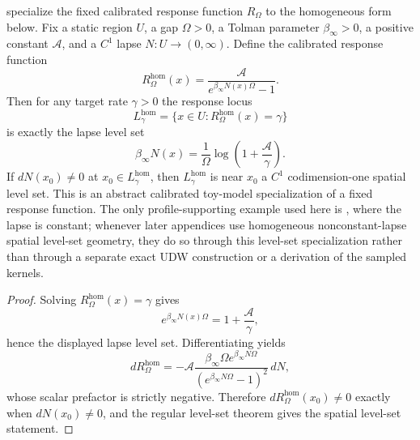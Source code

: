 \begin{lemma}\label{lem:abstract-homogeneous-specialization-main}
\ResponseStandingClause specialize the fixed calibrated response function $R_\Omega$ to the homogeneous form
below. Fix a static region $U$, a gap $\Omega>0$, a Tolman parameter
$\beta_\infty>0$, a positive constant \(\mathcal A\), and a $C^1$ lapse
$N:U\to(0,\infty)$. Define the calibrated response function
\[
R_\Omega^{\mathrm{hom}}(x)=\frac{\mathcal A}{e^{\beta_\infty N(x)\Omega}-1}.
\]
Then for any target rate $\gamma>0$ the response locus
\[
L_\gamma^{\mathrm{hom}}
=\{x\in U:R_\Omega^{\mathrm{hom}}(x)=\gamma\}
\]
is exactly the lapse level set
\[
\beta_\infty N(x)=\frac{1}{\Omega}\log\!\left(1+\frac{\mathcal A}{\gamma}\right).
\]
If $dN(x_0)\neq0$ at $x_0\in L_\gamma^{\mathrm{hom}}$, then
$L_\gamma^{\mathrm{hom}}$ is near $x_0$ a $C^1$ codimension-one spatial level
set. This is
an abstract calibrated toy-model specialization of a fixed response function.
The only profile-supporting example used here is
, where the lapse is constant; whenever
later appendices use homogeneous nonconstant-lapse spatial level-set geometry,
they do so through this level-set specialization rather than through a separate
exact UDW construction or a derivation of the sampled kernels.
\end{lemma}

\begin{proof}
Solving $R_\Omega^{\mathrm{hom}}(x)=\gamma$ gives
\[
e^{\beta_\infty N(x)\Omega}=1+\frac{\mathcal A}{\gamma},
\]
hence the displayed lapse level set. Differentiating yields
\[
dR_\Omega^{\mathrm{hom}}
=-\mathcal A\frac{\beta_\infty\Omega e^{\beta_\infty N\Omega}}
{(e^{\beta_\infty N\Omega}-1)^2}\,dN,
\]
whose scalar prefactor is strictly negative. Therefore
$dR_\Omega^{\mathrm{hom}}(x_0)\neq 0$ exactly when $dN(x_0)\neq0$, and the
regular level-set theorem gives the spatial level-set statement.
\end{proof}

